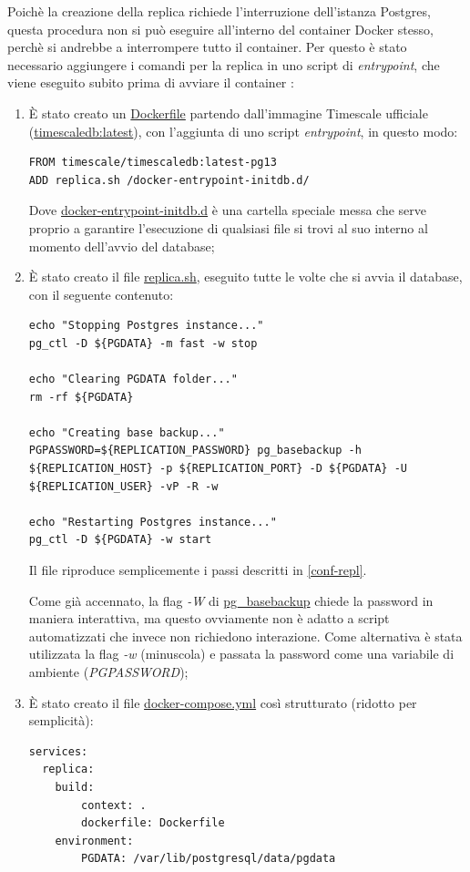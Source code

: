 Poichè la creazione della replica richiede l'interruzione dell'istanza Postgres, questa procedura non si può eseguire all'interno del container Docker stesso, perchè si andrebbe a interrompere tutto il container.
Per questo è stato necessario aggiungere i comandi per la replica in uno script di \textit{entrypoint}, che viene eseguito subito prima di avviare il container \cite{dockerfile}:
\begin{enumerate}
  \item È stato creato un \url{Dockerfile} partendo dall'immagine Timescale ufficiale (\url{timescaledb:latest}), con l'aggiunta di uno script \textit{entrypoint}, in questo modo:
  \vspace{1mm}
  \begin{lstlisting}[]
FROM timescale/timescaledb:latest-pg13
ADD replica.sh /docker-entrypoint-initdb.d/
\end{lstlisting}
Dove \url{docker-entrypoint-initdb.d} è una cartella speciale messa che serve proprio a garantire l'esecuzione di qualsiasi file si trovi al suo interno al momento dell'avvio del database;
  \item È stato creato il file \url{replica.sh}, eseguito tutte le volte che si avvia il database, con il seguente contenuto:
  \vspace{1mm}
  \begin{lstlisting}[]
echo "Stopping Postgres instance..." 
pg_ctl -D ${PGDATA} -m fast -w stop

echo "Clearing PGDATA folder..." 
rm -rf ${PGDATA}

echo "Creating base backup..." 
PGPASSWORD=${REPLICATION_PASSWORD} pg_basebackup -h ${REPLICATION_HOST} -p ${REPLICATION_PORT} -D ${PGDATA} -U ${REPLICATION_USER} -vP -R -w

echo "Restarting Postgres instance..." 
pg_ctl -D ${PGDATA} -w start
\end{lstlisting}
Il file riproduce semplicemente i passi descritti in \ref{conf-repl}.

Come già accennato, la flag \textit{-W} di \url{pg\_basebackup} chiede la password in maniera interattiva, ma questo ovviamente non è adatto a script automatizzati che invece non richiedono interazione. Come alternativa è stata utilizzata la flag \textit{-w} (minuscola) e passata la password come una variabile di ambiente (\textit{PGPASSWORD});
\item È stato creato il file \url{docker-compose.yml} così strutturato (ridotto per semplicità):
\vspace{1mm}
  \begin{lstlisting}[]
services:
  replica:
    build:
        context: .
        dockerfile: Dockerfile
    environment:
        PGDATA: /var/lib/postgresql/data/pgdata


\end{lstlisting}
\end{enumerate}
